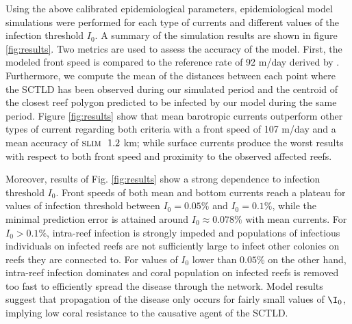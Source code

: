\documentclass[utf8]{frontiersSCNS}
\newcommand{\slim}{\textsc{slim}\ }
\begin{document}
Using the above calibrated epidemiological parameters, epidemiological model simulations were performed for each type of currents and different values of the infection threshold $I_0$. A summary of the simulation results are shown in figure \ref{fig:results}. Two metrics are used to assess the accuracy of the model. First, the modeled front speed is compared to the reference rate of 92 m/day derived by \citep{muller2020spatial}. Furthermore, we compute the mean of the distances between each point where the SCTLD has been observed during our simulated period and the centroid of the closest reef polygon predicted to be infected by our model during the same period. Figure \ref{fig:results} show that mean barotropic currents outperform other types of current regarding both criteria with a front speed of 107 m/day and a mean accuracy of $\slim ~1.2$ km; while surface currents produce the worst results with respect to both front speed and proximity to the observed affected reefs.

Moreover, results of Fig. \ref{fig:results} show a strong dependence to infection threshold $I_0$. Front speeds of both mean and bottom currents reach a plateau for values of infection threshold between $I_0=0.05\%$ and $I_0=0.1\%$, while the minimal prediction error is attained around $I_0 \approx 0.078\%$ with mean currents. For $I_0 > 0.1\%$, intra-reef infection is strongly impeded and populations of infectious individuals on infected reefs are not sufficiently large to infect other colonies on reefs they are connected to. For values of $I_0$ lower than $0.05\%$ on the other hand, intra-reef infection dominates and coral population on infected reefs is removed too fast to efficiently spread the disease through the network. Model results suggest that propagation of the disease only occurs for fairly small values of $\I_0$, implying low coral resistance to the causative agent of the SCTLD. 
\end{document}
